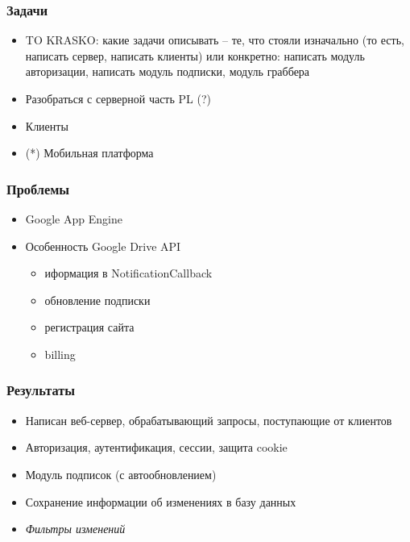 \documentclass[10pt,pdf,hyperref={unicode}]{beamer}
\begin{document}
    \begin{frame}\frametitle{Задачи}
        \begin{itemize}%
            \item	TO KRASKO: какие задачи описывать -- те, что стояли изначально (то есть, написать сервер, написать клиенты) или конкретно: написать модуль авторизации, написать модуль подписки, модуль граббера
            \item   Разобраться с серверной часть PL (?)
            \item   Клиенты
            \item   (*) Мобильная платформа
        \end{itemize}
    \end{frame}
    
    \begin{frame}\frametitle{Проблемы}
        \begin{itemize}%
	        \item   Google App Engine
	        \pause	        
            \item   Особенность Google Drive API
            \begin{itemize}
                \item иформация в NotificationCallback
                \item обновление подписки
                \item регистрация сайта
                \item billing                
            \end{itemize}
        \end{itemize}
    \end{frame}
    
    \begin{frame}\frametitle{Результаты}
        \begin{itemize}%
            \item	Написан веб-сервер, обрабатывающий запросы, поступающие от клиентов            
            \item	Авторизация, аутентификация, сессии, защита cookie
	        \pause
            \item	Модуль подписок (с автообновлением)
            \item	Сохранение информации об изменениях в базу данных
	        \pause
            \item	\textit{Фильтры изменений}
        \end{itemize}
    \end{frame}
    
\end{document}
